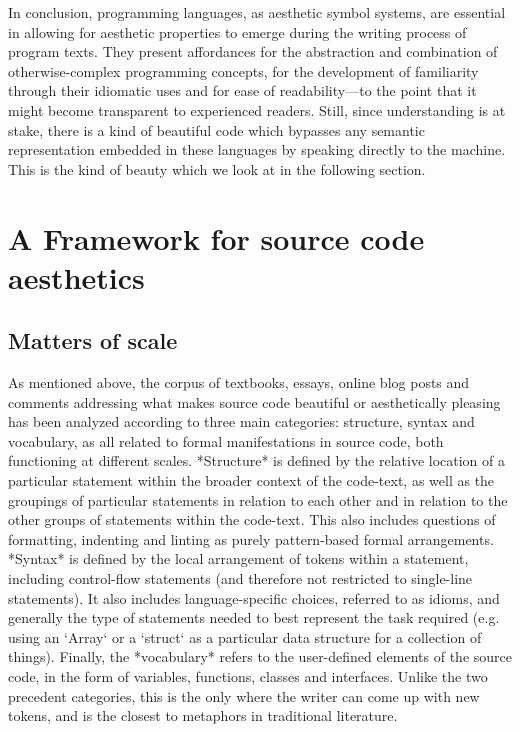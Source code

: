 
\spacer

In conclusion, programming languages, as aesthetic symbol systems, are essential in allowing for aesthetic properties to emerge during the writing process of program texts. They present affordances for the abstraction and combination of otherwise-complex programming concepts, for the development of familiarity through their idiomatic uses and for ease of readability—to the point that it might become transparent to experienced readers. Still, since understanding is at stake, there is a kind of beautiful code which bypasses any semantic representation embedded in these languages by speaking directly to the machine. This is the kind of beauty which we look at in the following section.

\section{A Framework for source code aesthetics}
\label{sec:programming-aesthetic-framework}

\subsection{Matters of scale}
\label{subsec:matters-of-scale}

As mentioned above, the corpus of textbooks, essays, online blog posts and comments addressing what makes source code beautiful or aesthetically pleasing has been analyzed according to three main categories: structure, syntax and vocabulary, as all related to formal manifestations in source code, both functioning at different scales. *Structure* is defined by the relative location of a particular statement within the broader context of the code-text, as well as the groupings of particular statements in relation to each other and in relation to the other groups of statements within the code-text. This also includes questions of formatting, indenting and linting as purely pattern-based formal arrangements. *Syntax* is defined by the local arrangement of tokens within a statement, including control-flow statements (and therefore not restricted to single-line statements). It also includes language-specific choices, referred to as idioms, and generally the type of statements needed to best represent the task required (e.g. using an `Array` or a `struct` as a particular data structure for a collection of things). Finally, the *vocabulary* refers to the user-defined elements of the source code, in the form of variables, functions, classes and interfaces. Unlike the two precedent categories, this is the only where the writer can come up with new tokens, and is the closest to metaphors in traditional literature.


